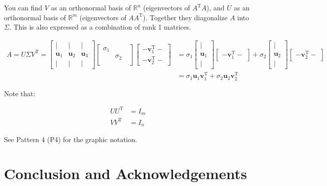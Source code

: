 \documentclass[letterpaper]{article}
\DeclareRobustCommand\transp{^{\mathrm{T}}}
\begin{document}
You can find $V$ as an orthonormal basis of $\mathbb{R}^n$ (eigenvectors of $A\transp A$),
and $U$ as an orthonormal basis of $\mathbb{R}^m$ (eigenvectors of $AA\transp$).
Together they diagonalize $A$ into $\Sigma$.
This is also expressed as a combination of rank 1 matrices.

\begin{align*}
  A = U \Sigma V\transp =
  \begin{bmatrix}
    | & | & |\\
    \bm{u}_1 & \bm{u}_2 & \bm{u}_3\\
    | & | & |
  \end{bmatrix}
  \begin{bmatrix}
    \sigma_1 \\
           & \sigma_2 \\
           & &
  \end{bmatrix}
  \begin{bmatrix}
  - \bm{v}_1\transp -\\
  - \bm{v}_2\transp -
  \end{bmatrix}
  & =
  \sigma_1 \begin{bmatrix}
    |\\
    \bm{u}_1\\
    |
  \end{bmatrix}
  \begin{bmatrix}
    - \bm{v}_1\transp - 
  \end{bmatrix}
  +
  \sigma_2 \begin{bmatrix}
  |\\
  \bm{u}_2\\
  |
  \end{bmatrix}
  \begin{bmatrix}
  - \bm{v}_2\transp -
  \end{bmatrix} \\
& = \sigma_1 \bm{u}_1 \bm{v}_1\transp + \sigma_2 \bm{u}_2 \bm{v}_2\transp
\end{align*}

Note that:

\begin{align*}
  U U\transp &= I_m \\
  V V\transp &= I_n
\end{align*}

See Pattern 4 (P4) for the graphic notation.

\section*{Conclusion and Acknowledgements}
\end{document}
